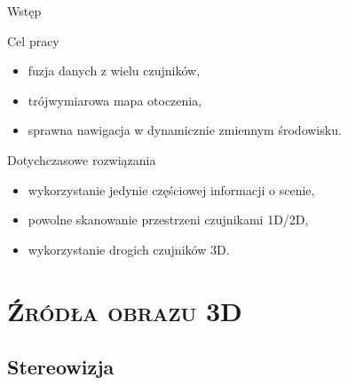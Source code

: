 \documentclass[xcolor=x11names,compress]{beamer}
\renewcommand{\(}{\begin{columns}}
\renewcommand{\)}{\end{columns}}
\newcommand{\<}[1]{\begin{column}{#1}}
\renewcommand{\>}{\end{column}}
\begin{document}
\begin{frame}{Wstęp}

\alert{Cel pracy}
\begin{itemize}
\item fuzja danych z wielu czujników,
\item trójwymiarowa mapa otoczenia,
\item sprawna nawigacja w dynamicznie zmiennym środowisku.
\end{itemize}

\vspace{.5cm}

\alert{Dotychczasowe rozwiązania}
\begin{itemize}
\item wykorzystanie jedynie częściowej informacji o scenie,
\item powolne skanowanie przestrzeni czujnikami 1D/2D,
\item wykorzystanie drogich czujników 3D.
\end{itemize}

\end{frame}

%
%
\section{\scshape Źródła obrazu 3D}

\subsection{Stereowizja}
\end{document}
